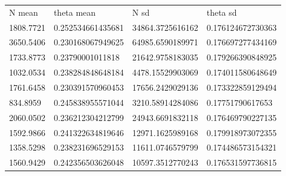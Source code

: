 \documentclass[10pt]{article}
\begin{document}
\begin{table}[h]
\begin{tabular}{llll}
N mean    & theta mean        & N sd             & theta sd                  \\
1808.7721 & 0.252534661435681 & 34864.3725616162 & 0.176124672730363 \\
3650.5406 & 0.230168067949625 & 64985.6590189971 & 0.176697277434169 \\
1733.8773 & 0.23790001011818  & 21642.9758183035 & 0.179266390848925 \\
1032.0534 & 0.238284848648184 & 4478.15529903069 & 0.174011580648649 \\
1761.6458 & 0.230391570960453 & 17656.2429029136 & 0.173322859129494 \\
834.8959  & 0.245838955571044 & 3210.58914284086 & 0.17751790617653  \\
2060.0502 & 0.236212304212799 & 24943.6691832118 & 0.176469790227135 \\
1592.9866 & 0.241322634819646 & 12971.1625989168 & 0.179918973072355 \\
1358.5298 & 0.238231696529153 & 11611.0746579799 & 0.174486573154321 \\
1560.9429 & 0.242356503626048 & 10597.3512770243 & 0.176531597736815
\end{tabular}
\end{table}
\end{document}
